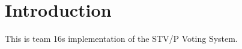 \hypertarget{index_intro_sec}{}\section{Introduction}\label{index_intro_sec}
This is team 16\textquotesingle{}s implementation of the S\+T\+V/P Voting System. 